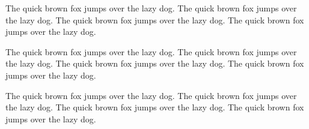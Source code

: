 \documentclass{article}
\begin{document}

\newintercharclass[FOO]{\myclassU}



The quick brown fox jumps over the lazy dog.
The quick brown fox jumps over the lazy dog.
The quick brown fox jumps over the lazy dog.
The quick brown fox jumps over the lazy dog.


\newintercharclass[BAR]{\myclassX}



The quick brown fox jumps over the lazy dog.
The quick brown fox jumps over the lazy dog.
The quick brown fox jumps over the lazy dog.
The quick brown fox jumps over the lazy dog.


The quick brown fox jumps over the lazy dog.
The quick brown fox jumps over the lazy dog.
The quick brown fox jumps over the lazy dog.
The quick brown fox jumps over the lazy dog.
\end{document}
